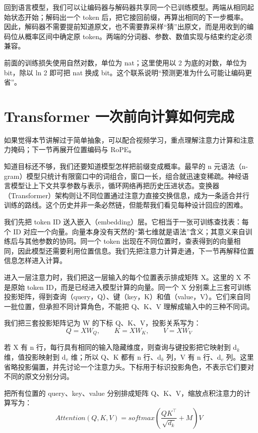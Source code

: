 回到语言模型，我们可以让编码器与解码器共享同一个已训练模型。两端从相同起始状态开始；解码出一个 token 后，把它接回前缀，再算出相同的下一步概率。因此，解码器不需要提前知道原文，也不需要靠采样``猜''出原文，而是用收到的编码位从概率区间中确定原 token。两端的分词器、参数、数值实现与结束约定必须兼容。

前面的训练损失使用自然对数，单位为 nat；这里使用以 2 为底的对数，单位为 bit，除以 ln 2 即可把 nat 换成 bit。这个联系说明``预测更准为什么可能让编码更省''。

\section{Transformer 一次前向计算如何完成}\label{Transformer 一次前向计算如何完成}

如果觉得本节讲解过于简单抽象，可以配合视频学习，重点理解注意力计算和注意力掩码；下一节再展开位置编码与 RoPE。

知道目标还不够，我们还要知道模型怎样把前缀变成概率。最早的 n 元语法（n-gram）模型只统计有限窗口中的词组合，窗口一长，组合就迅速变稀疏。神经语言模型让上下文共享参数与表示，循环网络再把历史压进状态。变换器（Transformer）架构则让不同位置通过注意力直接交换信息，成为一条适合并行训练的路线。这个历史并非一条必然链，但能帮我们看见每种设计回应的困难。

我们先把 token ID 送入嵌入（embedding）层。它相当于一张可训练查找表：每个 ID 对应一个向量。向量本身没有天然的``第七维就是语法''含义；其意义来自训练后与其他参数的协同。同一个 token 出现在不同位置时，查表得到的向量相同，因此模型还需要利用位置信息。我们先把注意力计算走通，下一节再解释位置信息怎样进入计算。

进入一层注意力时，我们把这一层输入的每个位置表示排成矩阵 X。这里的 X 不是原始 token ID，而是已经进入模型计算的向量。同一个 X 分别乘上三套可训练投影矩阵，得到查询（query，Q）、键（key，K）和值（value，V）。它们来自同一批位置，但承担不同计算角色，不能把 Q、K、V 理解成输入中的三种不同词。

我们把三套投影矩阵记为 W 的下标 Q、K、V，投影关系写为：
\[Q = XW_{Q},\quad\quad K = XW_{K},\quad\quad V = XW_{V}\]

若 X 有 n 行，每行具有相同的输入隐藏维度，则查询与键投影把它映射到 d\ensuremath{{}_{k}} 维，值投影映射到 d\ensuremath{{}_{v}} 维；所以 Q、K 都有 n 行、d\ensuremath{{}_{k}} 列，V 有 n 行、d\ensuremath{{}_{v}} 列。这里省略投影偏置，并先讨论一个注意力头。下标用于标识投影角色，不表示它们要对不同的原文分别分词。

把所有位置的 query、key、value 分别排成矩阵 Q、K、V，缩放点积注意力的计算写为：
\[Attention(Q,K,V) = softmax\left( \frac{QK^{\top}}{\sqrt{d_{k}}} + M \right)V\]

